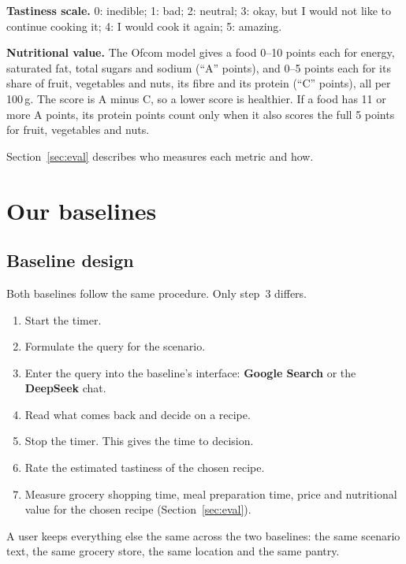 \documentclass[11pt]{article}
\newcommand{\lead}[1]{{\sffamily\bfseries\color{accent}#1}\hspace{0.5em}}
\begin{document}
\lead{Tastiness scale.}
0: inedible; 1: bad; 2: neutral; 3: okay, but I would not like to continue cooking it; 4: I would cook it again; 5: amazing.

\lead{Nutritional value.}
The Ofcom model gives a food 0--10 points each for energy, saturated fat, total sugars and sodium (``A'' points),
and 0--5 points each for its share of fruit, vegetables and nuts, its fibre and its protein (``C'' points), all per 100\,g.
The score is A minus C, so a lower score is healthier.
If a food has 11 or more A points, its protein points count only when it also scores the full 5 points for fruit, vegetables and nuts.

Section~\ref{sec:eval} describes who measures each metric and how.

\FloatBarrier
\section{Our baselines}

\subsection{Baseline design}

Both baselines follow the same procedure. Only step~3 differs.

\begin{tcolorbox}[note]
\begin{enumerate}[leftmargin=1.4em, itemsep=1.5pt, topsep=0pt, label=\textbf{\sffamily\color{accent}\arabic*.}]
\item Start the timer.
\item Formulate the query for the scenario.
\item Enter the query into the baseline's interface: \textbf{Google Search} or the \textbf{DeepSeek} chat.
\item Read what comes back and decide on a recipe.
\item Stop the timer. This gives the time to decision.
\item Rate the estimated tastiness of the chosen recipe.
\item Measure grocery shopping time, meal preparation time, price and nutritional value for the chosen recipe (Section~\ref{sec:eval}).
\end{enumerate}
\end{tcolorbox}

A user keeps everything else the same across the two baselines:
the same scenario text, the same grocery store, the same location and the same pantry.
\end{document}
